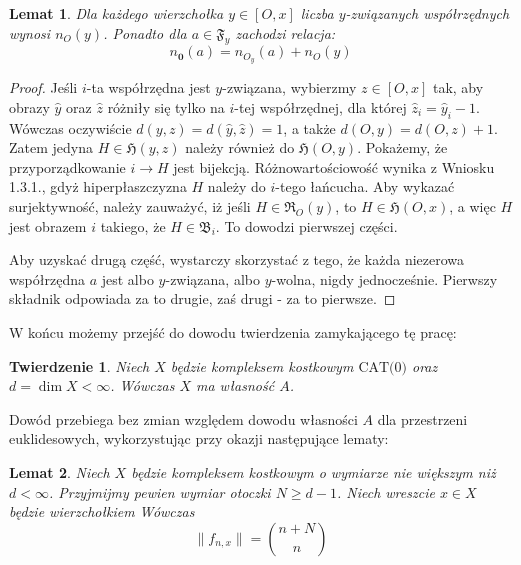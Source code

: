 \documentclass[licencjacka]{pracamgr}
\theoremstyle{definition}
\theoremstyle{definition}
\theoremstyle{definition}
\theoremstyle{definition}
\theoremstyle{definition}
\theoremstyle{plain}
\newtheorem{lemma}{Lemat}[section]
\theoremstyle{plain}
\newtheorem{theorem}{Twierdzenie}[section]
\begin{document}
\begin{lemma}
	Dla każdego wierzchołka $ y \in [O,x] $ liczba $ y $-związanych współrzędnych 
	wynosi $ n_O (y) $. Ponadto dla $ a \in \mathfrak{F}_y $ zachodzi relacja:
	$$ n_{\textbf{0}}(a) = n_{O_y}(a) + n_O(y) $$
\end{lemma}
\begin{proof}
	Jeśli $ i $-ta współrzędna jest $ y $-związana, wybierzmy $ z\in[O,x] $ tak, aby 
	obrazy $ \hat y $ oraz $ \hat z $ różniły się tylko na $ i $-tej współrzędnej, dla której 
	$ \hat z_i = \hat y_i - 1  $. Wówczas oczywiście $ d(y,z) = d(\hat y, \hat z) = 1 $, a 
	także $ d(O,y) = d(O,z) + 1 $. Zatem jedyna $ H \in \mathfrak{H}(y,z) $ należy 
	również do $ \mathfrak{H}(O,y) $. Pokażemy, że przyporządkowanie $ i \rightarrow H $ jest 
	bijekcją. Różnowartościowość wynika z Wniosku 1.3.1., gdyż hiperpłaszczyzna 
	$ H $ należy do $ i $-tego łańcucha. Aby wykazać surjektywność, należy zauważyć, iż 
	jeśli $ H \in \mathfrak{R}_O(y) $, to $ H \in \mathfrak{H}(O,x) $, a więc 
	$ H $ jest obrazem $ i $ takiego, że $ H \in \mathfrak{B}_i $. To dowodzi pierwszej 
	części.

	Aby uzyskać drugą część, wystarczy skorzystać z tego, że każda niezerowa współrzędna 
	$ a $ jest albo $ y $-związana, albo $ y $-wolna, nigdy jednocześnie. Pierwszy składnik 
	odpowiada za to drugie, zaś drugi - za to pierwsze.
\end{proof}

W końcu możemy przejść do dowodu twierdzenia zamykającego tę pracę:

\begin{theorem}
	Niech $ X $ będzie kompleksem kostkowym $\text{CAT(0)} $ oraz $ d= \dim X < \infty $. 
	Wówczas $ X $ ma własność $ A $.
\end{theorem}

Dowód przebiega bez zmian względem dowodu własności $ A $ dla przestrzeni euklidesowych, 
wykorzystując przy okazji następujące lematy:

\begin{lemma}
	Niech $ X $ będzie kompleksem kostkowym o wymiarze nie większym niż $ d < \infty$. 
	Przyjmijmy pewien wymiar otoczki $ N \geq d-1 $. Niech wreszcie $ x \in X $ będzie 
	wierzchołkiem Wówczas 
	$$ \|f_{n,x}\| = {n + N \choose n} $$
\end{lemma}
\end{document}
